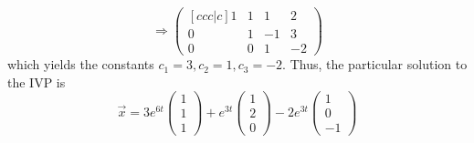 \documentclass[11pt, titlepage]{article}
\begin{document}
\begin{enumerate}
\begin{solution}
\begin{equation*}
        \Longrightarrow
        \begin{pmatrix}[ccc|c]
          1 & 1 & 1 & 2 \\
          0 & 1 & -1 & 3 \\
          0 & 0 & 1 & -2
        \end{pmatrix}
      \end{equation*}
      which yields the constants \(c_{1} = 3, c_{2} = 1, c_{3} = -2\).
      Thus, the particular solution to the IVP is
      \begin{equation*}
        \vec{x} = 3 e^{6t}
        \begin{pmatrix}
          1 \\
          1 \\
          1
        \end{pmatrix} +
        e^{3t}
        \begin{pmatrix}
          1 \\
          2 \\
          0
        \end{pmatrix} -
        2 e^{3t}
        \begin{pmatrix}
          1 \\
          0 \\
          -1
        \end{pmatrix}
      \end{equation*}
    \end{solution}

  \end{enumerate}
\end{document}
